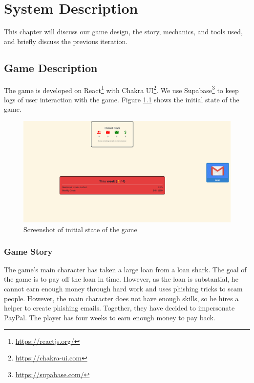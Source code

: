 




\chapter{System Description}

This chapter will discuss our game design, the story, mechanics, and tools used, and briefly discuss the previous iteration.

\section{Game Description}
The game is developed on React\footnote{\url{https://reactjs.org/}} with Chakra UI\footnote{\url{https://chakra-ui.com}}. We use Supabase\footnote{\url{https://supabase.com/}} to keep logs of user interaction with the game. Figure \ref{fig:screenshot} shows the initial state of the game.

\begin{figure}[h]
    \centering
    \includegraphics[width=\textwidth]{figures/section2/game.png}
    \caption{Screenshot of initial state of the game}
    \label{fig:screenshot}
\end{figure}

\subsection{Game Story}
The game's main character has taken a large loan from a loan shark. The goal of the game is to pay off the loan in time. However, as the loan is substantial, he cannot earn enough money through hard work and uses phishing tricks to scam people. However, the main character does not have enough skills, so he hires a helper to create phishing emails. Together, they have decided to impersonate PayPal. The player has four weeks to earn enough money to pay back.

